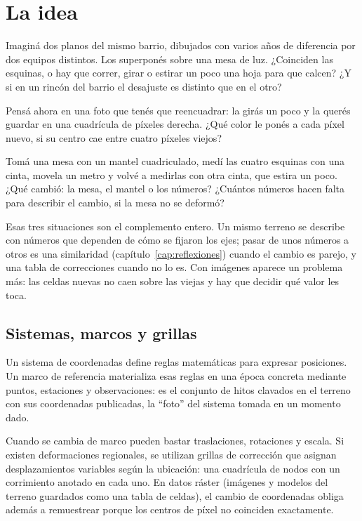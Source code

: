 \label{cap:marcos}

\section{La idea}

Imaginá dos planos del mismo barrio, dibujados con varios años de diferencia por dos equipos
distintos. Los superponés sobre una mesa de luz.
¿Coinciden las esquinas, o hay que correr, girar o estirar un poco una hoja para que calcen?
¿Y si en un rincón del barrio el desajuste es distinto que en el otro?

Pensá ahora en una foto que tenés que reencuadrar: la girás un poco y la querés guardar en una
cuadrícula de píxeles derecha.
¿Qué color le ponés a cada píxel nuevo, si su centro cae entre cuatro píxeles viejos?

Tomá una mesa con un mantel cuadriculado, medí las cuatro esquinas con una cinta, movela un
metro y volvé a medirlas con otra cinta, que estira un poco.
¿Qué cambió: la mesa, el mantel o los números?
¿Cuántos números hacen falta para describir el cambio, si la mesa no se deformó?

Esas tres situaciones son el complemento entero. Un mismo terreno se describe con números que
dependen de cómo se fijaron los ejes; pasar de unos números a otros es una similaridad
(capítulo~\ref{cap:reflexiones}) cuando el cambio es parejo, y una tabla de correcciones
cuando no lo es. Con imágenes aparece un problema más: las celdas nuevas no caen sobre las
viejas y hay que decidir qué valor les toca.

\subsection{Sistemas, marcos y grillas}\label{sec:sistemas-marcos}

Un sistema de coordenadas define reglas matemáticas para expresar posiciones. Un marco de
referencia materializa esas reglas en una época concreta mediante puntos, estaciones y
observaciones: es el conjunto de hitos clavados en el terreno con sus coordenadas publicadas,
la \enquote{foto} del sistema tomada en un momento dado.

Cuando se cambia de marco pueden bastar traslaciones, rotaciones y escala. Si existen
deformaciones regionales, se utilizan grillas de corrección que asignan desplazamientos
variables según la ubicación: una cuadrícula de nodos con un corrimiento anotado en cada uno.
En datos ráster (imágenes y modelos del terreno guardados como una tabla de celdas), el cambio
de coordenadas obliga además a remuestrear porque los centros de píxel no coinciden
exactamente.

